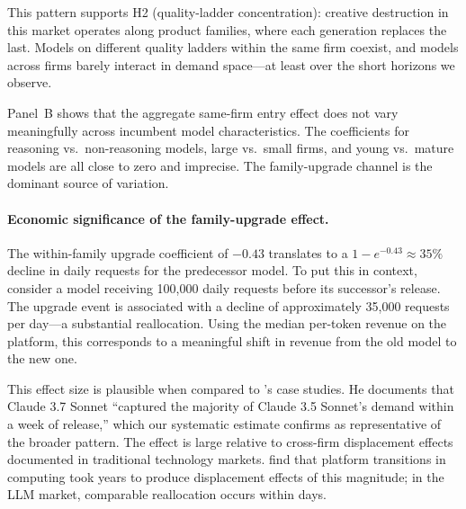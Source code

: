 \documentclass[11pt, a4paper]{article}
\begin{document}
This pattern supports H2 (quality-ladder concentration): creative destruction in this market operates along product families, where each generation replaces the last. Models on different quality ladders within the same firm coexist, and models across firms barely interact in demand space---at least over the short horizons we observe.

Panel~B shows that the aggregate same-firm entry effect does not vary meaningfully across incumbent model characteristics. The coefficients for reasoning vs.\ non-reasoning models, large vs.\ small firms, and young vs.\ mature models are all close to zero and imprecise. The family-upgrade channel is the dominant source of variation.

\paragraph{Economic significance of the family-upgrade effect.} The within-family upgrade coefficient of $-0.43$ translates to a $1 - e^{-0.43} \approx 35\%$ decline in daily requests for the predecessor model. To put this in context, consider a model receiving 100,000 daily requests before its successor's release. The upgrade event is associated with a decline of approximately 35,000 requests per day---a substantial reallocation. Using the median per-token revenue on the platform, this corresponds to a meaningful shift in revenue from the old model to the new one.

This effect size is plausible when compared to \citet{fradkin2025demand}'s case studies. He documents that Claude 3.7 Sonnet ``captured the majority of Claude 3.5 Sonnet's demand within a week of release,'' which our systematic estimate confirms as representative of the broader pattern. The effect is large relative to cross-firm displacement effects documented in traditional technology markets. \citet{bresnahan1999technological} find that platform transitions in computing took years to produce displacement effects of this magnitude; in the LLM market, comparable reallocation occurs within days.
\end{document}
